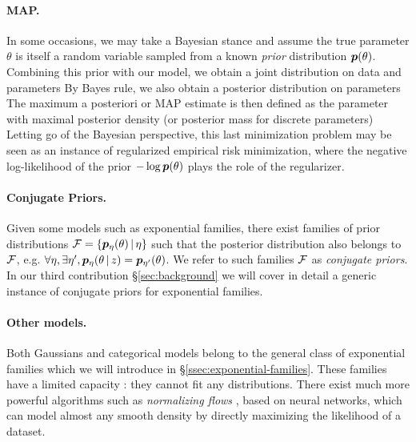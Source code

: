 \paragraph{MAP.}
In some occasions, we may take a Bayesian stance and assume the true parameter $\theta$ is itself a random variable sampled from a known \emph{prior} distribution $\bm{p}(\theta)$. 
Combining this prior with our model, we obtain a joint distribution on data and parameters 
By Bayes rule, we also obtain a posterior distribution on parameters 
The maximum a posteriori or MAP estimate is then defined as the parameter with maximal posterior density (or posterior mass for discrete parameters)
Letting go of the Bayesian perspective, this last minimization problem may be seen as an instance of regularized empirical risk minimization, where the negative log-likelihood of the prior $- \log \bm{p}(\theta)$ plays the role of the regularizer.

\paragraph{Conjugate Priors.}
Given some models such as exponential families, there exist families of prior distributions ${\mathcal F} = \{\bm{p}_\eta (\theta) \,\vert\, \eta\}$ 
such that the posterior distribution also belongs to ${\mathcal F}$, 
e.g.  $\forall \eta, \exists \eta', \bm{p}_\eta (\theta \,\vert\, z) = \bm{p}_{\eta'}(\theta)$.
We refer to such families ${\mathcal F}$ as \emph{conjugate priors}.
In our third contribution \S\ref{sec:background} we will cover in detail a generic instance of conjugate priors for exponential families.

\paragraph{Other models.}
Both Gaussians and categorical models belong to the general class of exponential families which we will introduce in \S\ref{ssec:exponential-families}.
These families have a limited capacity : they cannot fit any distributions.
There exist much more powerful algorithms such as \emph{normalizing flows} \citep{rezende2015variational}, based on neural networks, which can model almost any smooth density by directly maximizing the likelihood of a dataset.

